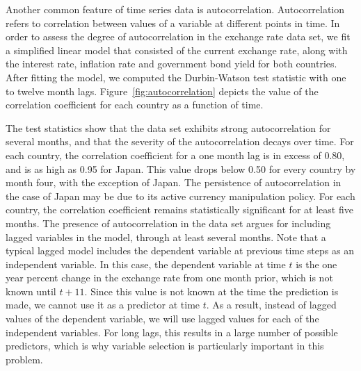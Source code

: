 \documentclass{sig-alternate-05-2015}
\begin{document}
Another common feature of time series data is autocorrelation. Autocorrelation refers to correlation between values of a variable at different points in time. In order to assess the degree of autocorrelation in the exchange rate data set, we fit a simplified linear model that consisted of the current exchange rate, along with the interest rate, inflation rate and government bond yield for both countries. After fitting the model, we computed the Durbin-Watson test statistic with one to twelve month lags. Figure~\ref{fig:autocorrelation} depicts the value of the correlation coefficient for each country as a function of time.
\par{} The test statistics show that the data set exhibits strong autocorrelation for several months, and that the severity of the autocorrelation decays over time. For each country, the correlation coefficient for a one month lag is in excess of 0.80, and is as high as 0.95 for Japan. This value drops below 0.50 for every country by month four, with the exception of Japan. The persistence of autocorrelation in the case of Japan may be due to its active currency manipulation policy. For each country, the correlation coefficient remains statistically significant for at least five months. The presence of autocorrelation in the data set argues for including lagged variables in the model, through at least several months. Note that a typical lagged model includes the dependent variable at previous time steps as an independent variable. In this case, the dependent variable at time $t$ is the one year percent change in the exchange rate from one month prior, which is not known until $t+11$. Since this value is not known at the time the prediction is made, we cannot use it as a predictor at time $t$. As a result, instead of lagged values of the dependent variable, we will use lagged values for each of the independent variables. For long lags, this results in a large number of possible predictors, which is why variable selection is particularly important in this problem.

\end{document}
